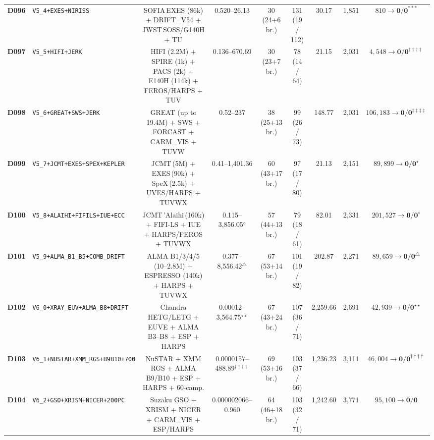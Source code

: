 \documentclass[twocolumn,10pt]{article}
\begin{document}
\begin{table}[t]
{\begin{tabular}{llccccccc}
\textbf{D096} & \texttt{V5\_4+EXES+NIRISS} & SOFIA\,EXES (86k) + DRIFT\_V54 + JWST\,SOSS/G140H + TU & 0.520--26.13 & 30 (24+6 br.) & 131 (19 / 112) & 30.17 & 1,851 & $810 \rightarrow \mathbf{0} / \mathbf{0}^{\ast\ast\ast}$ \\
\textbf{D097} & \texttt{V5\_5+HIFI+JERK} & HIFI (2.2M) + SPIRE (1k) + PACS (2k) + E140H (114k) + FEROS/HARPS + TUV & 0.136--670.69 & 30 (23+7 br.) & 78 (14 / 64) & 21.15 & 2,031 & $4{,}548 \rightarrow \mathbf{0} / \mathbf{0}^{\dagger\dagger\dagger\dagger}$ \\
\textbf{D098} & \texttt{V5\_6+GREAT+SWS+JERK} & GREAT (up to 19.4M) + SWS + FORCAST + CARM\_VIS + TUVW & 0.52--237 & 38 (25+13 br.) & 99 (26 / 73) & 148.77 & 2,031 & $106{,}183 \rightarrow \mathbf{0} / \mathbf{0}^{\ddagger\ddagger\ddagger\ddagger}$ \\
\textbf{D099} & \texttt{V5\_7+JCMT+EXES+SPEX+KEPLER} & JCMT\,(5M) + EXES\,(90k) + SpeX\,(2.5k) + UVES/HARPS + TUVWX & 0.41--1,401.36 & 60 (43+17 br.) & 97 (17 / 80) & 21.13 & 2,151 & $89{,}899 \rightarrow \mathbf{0} / \mathbf{0}^{\star}$ \\
\textbf{D100} & \texttt{V5\_8+ALAIHI+FIFILS+IUE+ECC} & JCMT\,'Alaihi\,(160k) + FIFI-LS + IUE + HARPS/FEROS + TUVWX & 0.115--3,856.05$^{\diamond}$ & 57 (44+13 br.) & 79 (18 / 61) & 82.01 & 2,331 & $201{,}527 \rightarrow \mathbf{0} / \mathbf{0}^{\diamond}$ \\
\textbf{D101} & \texttt{V5\_9+ALMA\_B1\_B5+COMB\_DRIFT} & ALMA B1/3/4/5 (10--2.8M) + ESPRESSO (140k) + HARPS + TUVWX & 0.377--8,556.42$^{\triangle}$ & 67 (53+14 br.) & 101 (19 / 82) & 202.87 & 2,271 & $89{,}659 \rightarrow \mathbf{0} / \mathbf{0}^{\triangle}$ \\
\textbf{D102} & \texttt{V6\_0+XRAY\_EUV+ALMA\_B8+DRIFT} & Chandra HETG/LETG + EUVE + ALMA B3--B8 + ESP + HARPS & 0.00012--3,564.75$^{\star\star}$ & 67 (43+24 br.) & 107 (36 / 71) & 2,259.66 & 2,691 & $42{,}939 \rightarrow \mathbf{0} / \mathbf{0}^{\star\star}$ \\
\textbf{D103} & \texttt{V6\_1+NUSTAR+XMM\_RGS+B9B10+700} & NuSTAR + XMM RGS + ALMA B9/B10 + ESP + HARPS + 60-camp. & 0.0000157--488.89$^{\dagger\dagger\dagger\dagger}$ & 69 (53+16 br.) & 103 (37 / 66) & 1,236.23 & 3,111 & $46{,}004 \rightarrow \mathbf{0} / \mathbf{0}^{\dagger\dagger\dagger\dagger}$ \\
\textbf{D104} & \texttt{V6\_2+GSO+XRISM+NICER+200PC} & Suzaku GSO + XRISM + NICER + CARM\_VIS + ESP/HARPS & 0.000002066--0.960 & 64 (46+18 br.) & 103 (32 / 71) & 1,242.60 & 3,771 & $95{,}100 \rightarrow \mathbf{0} / \mathbf{0}$ \\

\end{tabular}}
\end{table}
\end{document}

